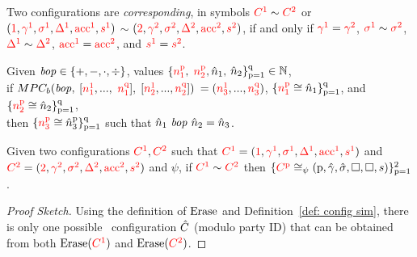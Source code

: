 \begin{definition}%
\label{def: config sim}
Two configurations are \emph{corresponding}, in symbols $\textcolor{red}{C^1} \sim \textcolor{red}{C^2}$ or 
$(\textcolor{red}{1}, \textcolor{red}{\gamma^1}, \textcolor{red}{\sigma^1}, \textcolor{red}{\Delta^1}, \textcolor{red}{\mathrm{acc}^1}, \textcolor{red}{s^1})$ $\sim$ $(\textcolor{red}{2}, \textcolor{red}{\gamma^2}, \textcolor{red}{\sigma^2}, \textcolor{red}{\Delta^2}, \textcolor{red}{\mathrm{acc}^2}, \textcolor{red}{s^2})$, 
if and only if 
$\textcolor{red}{\gamma^1}=\textcolor{red}{\gamma^2}$, $\textcolor{red}{\sigma^1} \sim \textcolor{red}{\sigma^2}$, $\textcolor{red}{\Delta^1} \sim \textcolor{red}{\Delta^2}$, $\textcolor{red}{\mathrm{acc}^1}=\textcolor{red}{\mathrm{acc}^2}$, and $\textcolor{red}{s^1}=\textcolor{red}{s^2}$. 
\end{definition}



\begin{axiom}[$MPC_b$]%
\label{axiom: mpc bop}
Given $\mathit{bop}\in\{+,-,\cdot, \div\}$, values $\{\textcolor{red}{n^{\mathrm{{p}}}_{1}},$ $\textcolor{red}{n^{\mathrm{{p}}}_{2}}, \hat{n}_{1},$ $\hat{n}_{2}\}^{\mathrm{{q}}}_{\mathrm{{p}}=\mathrm{{1}}}\in\mathbb{N}$, 
\\
if $MPC_b(\mathit{bop},$ $[\textcolor{red}{n^{\mathrm{{1}}}_{1}}, ...,$ $\textcolor{red}{n^{\mathrm{{q}}}_{1}}],$ $[\textcolor{red}{n^{\mathrm{{1}}}_{2}}, ..., \textcolor{red}{n^{\mathrm{{q}}}_{2}}])$ $= (\textcolor{red}{n^{\mathrm{{1}}}_{3}}, ..., \textcolor{red}{n^{\mathrm{{q}}}_{3}})$, 
$\{\textcolor{red}{n^{\mathrm{{p}}}_{1}} \cong \hat{n}_1\}^{\mathrm{{q}}}_{\mathrm{{p}}=\mathrm{{1}}}$, 
	and
$\{\textcolor{red}{n^{\mathrm{{p}}}_{2}} \cong \hat{n}_2\}^{\mathrm{{q}}}_{\mathrm{{p}}=\mathrm{{1}}}$,  
\\
then $\{\textcolor{red}{n^{\mathrm{{p}}}_{3}} \cong \hat{n}^{\mathrm{{p}}}_3\}^{\mathrm{{q}}}_{\mathrm{{p}}=\mathrm{{1}}}$ 
such that $\hat{n}_1\ \mathit{bop}\ \hat{n}_2 = \hat{n}_3$. 
\end{axiom}


\begin{lemma}%
\label{lem: sim implies cong same}
Given two configurations $\textcolor{red}{C^1},\textcolor{red}{C^2}$ such that 
$\textcolor{red}{C^1} = (\textcolor{red}{1}, \textcolor{red}{\gamma^1}, \textcolor{red}{\sigma^1}, \textcolor{red}{\Delta^1}, \textcolor{red}{\mathrm{acc}^1}, \textcolor{red}{s^1})$ and $\textcolor{red}{C^2} = (\textcolor{red}{2}, \textcolor{red}{\gamma^2}, \textcolor{red}{\sigma^2}, \textcolor{red}{\Delta^2}, \textcolor{red}{\mathrm{acc}^2}, \textcolor{red}{s^2})$ and $\psi$, 
if $\textcolor{red}{C^1} \sim \textcolor{red}{C^2}$ 
then $\{\textcolor{red}{C^{\mathrm{{p}}}}\cong_{\psi}(\mathrm{{p}}, \hat{\gamma}, \hat{\sigma}, \Box, \Box, s)\}^2_{\mathrm{{p}}=1}$. 
\end{lemma}
\begin{proof}[Proof Sketch]%
Using the definition of $\mathrm{Erase}$ and Definition~\ref{def: config sim}, there is only one possible \vanillaC\ configuration $\hat{C}$ (modulo party ID) that can be obtained from both 
$\mathrm{Erase}(\textcolor{red}{C^1})$ and $\mathrm{Erase}(\textcolor{red}{C^2})$. 
\end{proof}





